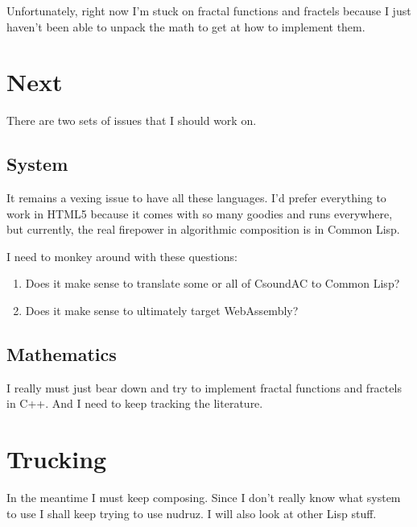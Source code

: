 \documentclass[a4paper,10pt]{scrartcl}
\begin{document}
Unfortunately, right now I'm stuck on fractal functions and fractels because I 
just haven't been able to unpack the math to get at how to implement them.

\section*{Next}

There are two sets of issues that I should work on.

\subsection*{System}

It remains a vexing issue to have all these languages. I'd prefer everything 
to work in HTML5 because it comes with so many goodies and runs everywhere, 
but currently, the real firepower in algorithmic composition is in Common Lisp.

I need to monkey around with these questions:

\begin{enumerate}
 \item Does it make sense to translate some or all of CsoundAC to Common Lisp? 
 \item Does it make sense to ultimately target WebAssembly?
\end{enumerate}

\subsection*{Mathematics}

I really must just bear down and try to implement fractal functions and 
fractels in C++. And I need to keep tracking the literature.

\section*{Trucking}

In the meantime I must keep composing. Since I don't really know what system 
to use I shall keep trying to use nudruz. I will also look at other Lisp stuff.
\end{document}

